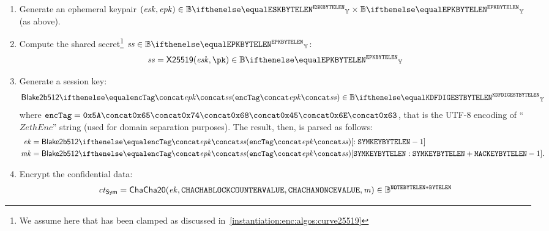 \begin{enumerate}
    \item Generate an ephemeral  keypair $(\esk, \epk) \in \BBy{\eskByteLen} \times \BBy{\epkByteLen}$ (as above).
    \item Compute the shared secret\footnote{We assume here that \esk{} has been clamped as discussed in~\cref{instantiation:enc:algos:curve25519}} $\sharedSecret \in \BBy{\epkByteLen}$:
    \[
        \sharedSecret = \xscalarmult{25519}(\esk, \pk) \in \BBy{\epkByteLen}
    \]
    \item Generate a session key:
    \[
        \blake{2b512}{\encTag \concat \epk \concat \sharedSecret} \in \BBy{\kdfDigestByteLen}
    \]
    where $\encTag = \bytestyle{5A} \concat \bytestyle{65} \concat \bytestyle{74} \concat \bytestyle{68} \concat \bytestyle{45} \concat \bytestyle{6E} \concat \bytestyle{63}$, that is the UTF-8 encoding of ``$ZethEnc$'' string (used for domain separation purposes). The result, then, is parsed as follows:
    \begin{align*}
        \ek &= \blake{2b512}{\encTag \concat\epk \concat\sharedSecret}[: \symKeyByteLen-1]\\
        \mk &= \blake{2b512}{\encTag \concat\epk \concat\sharedSecret}[\symKeyByteLen: \symKeyByteLen + \macKeyByteLen-1].
    \end{align*}
    \item Encrypt the confidential data:
    \[
        \mathit{ct}_{\mathsf{Sym}} = \mathsf{ChaCha20}(\mathit{ek}, \mathtt{CHACHABLOCKCOUNTERVALUE}, \mathtt{CHACHANONCEVALUE}, \mathit{m}) \in \mathbb{B}^{\mathtt{NOTEBYTELEN} * \mathtt{BYTELEN}}
    \]


\end{enumerate}
